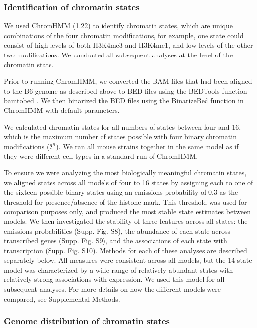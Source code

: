 \documentclass[
  11pt,
]{article}
\begin{document}
\hypertarget{identification-of-chromatin-states}{%
\subsubsection{Identification of chromatin
states}\label{identification-of-chromatin-states}}

We used ChromHMM (1.22) \citep{pmid29120462} to identify chromatin
states, which are unique combinations of the four chromatin
modifications, for example, one state could consist of high levels of
both H3K4me3 and H3K4me1, and low levels of the other two modifications.
We conducted all subsequent analyses at the level of the chromatin
state.

Prior to running ChromHMM, we converted the BAM files that had been
aligned to the B6 genome as described above to BED files using the
BEDTools function bamtobed \citep{quinlan2010bedtools}. We then
binarized the BED files using the BinarizeBed function in ChromHMM with
default parameters.

We calculated chromatin states for all numbers of states between four
and 16, which is the maximum number of states possible with four binary
chromatin modifications (\(2^n\)). We ran all mouse strains together in
the same model as if they were different cell types in a standard run of
ChromHMM.

To ensure we were analyzing the most biologically meaningful chromatin
states, we aligned states across all models of four to 16 states by
assigning each to one of the sixteen possible binary states using an
emissions probability of 0.3 as the threshold for presence/absence of
the histone mark. This threshold was used for comparison purposes only,
and produced the most stable state estimates between models. We then
investigated the stability of three features across all states: the
emissions probabilities (Supp. Fig. S8), the abundance of each state
across transcribed genes (Supp. Fig. S9), and the associations of each
state with transcription (Supp. Fig. S10). Methods for each of these
analyses are described separately below. All measures were consistent
across all models, but the 14-state model was characterized by a wide
range of relatively abundant states with relatively strong associations
with expression. We used this model for all subsequent analyses. For
more details on how the different models were compared, see Supplemental
Methods.

\hypertarget{genome-distribution-of-chromatin-states}{%
\subsubsection{Genome distribution of chromatin
states}\label{genome-distribution-of-chromatin-states}}
\end{document}
